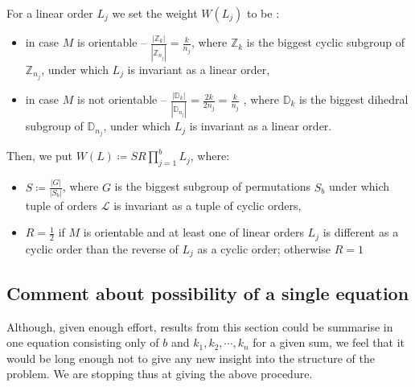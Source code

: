 For a linear 
order $L_j$ we set the 
weight $W(L_j)$ to be 
:  
\begin{itemize}
\item in case $M$ is orientable -- $\frac{|\mathbb{Z}_k|}{|\mathbb{Z}_{n_j}|} = \frac{k}{n_j}$, 
where $\mathbb{Z}_k$ 
is the biggest cyclic subgroup of $\mathbb{Z}_{n_j}$, under which $L_j$ 
is invariant as a linear order,
\item in case $M$ is not orientable -- $\frac{|\mathbb{D}_k|}{|\mathbb{D}_{n_j}|} = 
\frac{2k}{2n_j} 
=\frac{k}{n_j}$ , 
where $\mathbb{D}_k$ is 
the biggest dihedral 
subgroup of $\mathbb{D}_{n_j}$, under 
which $L_j$ is invariant as a linear order. 
\end{itemize}

Then, we put $W(L) \coloneqq SR\prod_{j=1}^bL_j$, where:
\begin{itemize}
\item $S \coloneqq \frac{|G|}{|S_b|}$, where $G$ is the biggest subgroup of permutations 
$S_b$ under which 
tuple of orders $\mathcal{L}$ is invariant as a tuple of cyclic orders, 
\item $R = \frac{1}{2}$ if
$M$ is orientable and  
at least one of linear orders $L_j$ is different as a cyclic order than the 
reverse of $L_j$ as a cyclic order; 
otherwise $R = 1$
\end{itemize}




\subsection{Comment about possibility of a single equation}
Although, given enough effort, results from this section could be summarise in one 
equation consisting only 
of $b$ and $k_1, k_2, \cdots, k_n$ for a given sum, 
we feel that it would be long enough not to give any new 
insight into the structure of the problem. We are stopping thus at giving the above procedure.


